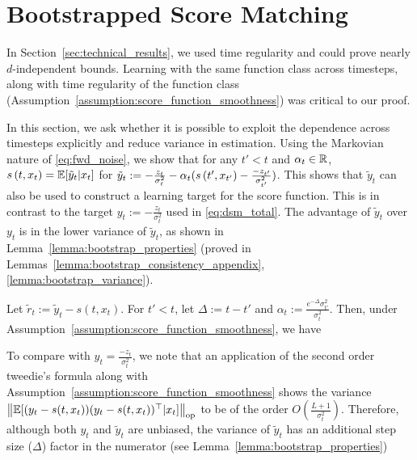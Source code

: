 \vspace{-5pt}
\section{Bootstrapped Score Matching}
\label{sec:bootstrapped_score_matching}

In Section~\ref{sec:technical_results},  we used time regularity and could prove nearly $d$-independent bounds. Learning with the same function class across timesteps, along with time regularity of the function class (Assumption~\ref{assumption:score_function_smoothness}) was critical to our proof.

In this section, we ask whether it is possible to exploit the dependence across timesteps explicitly and reduce variance in estimation. Using the Markovian nature of \eqref{eq:fwd_noise}, we show that for any $t' < t$ and $\alpha_t \in \mathbb{R}$, $s\left(t, x_t\right) = \mathbb{E}[\tilde{y}_{t}|x_t]$ for $\tilde{y}_{t} := -\frac{z_t}{\sigma_t^{2}} - \alpha_t(s\left(t', x_{t'}\right) - \frac{-z_{t'}}{\sigma_{t'}^{2}})$. This shows that $\tilde{y}_{t}$ can also be used to construct a learning target for the score function. This is in contrast to the target $y_{t} := -\frac{z_t}{\sigma_t^{2}}$ used in \eqref{eq:dsm_total}. The advantage of $\tilde{y}_{t}$ over $y_t$ is in the lower variance of $\tilde{y}_{t}$, as shown in Lemma~\ref{lemma:bootstrap_properties} (proved in Lemmas~\ref{lemma:bootstrap_consistency_appendix}, \ref{lemma:bootstrap_variance}). 

\begin{lemma}\label{lemma:bootstrap_properties} Let $\tilde{r}_{t} := \tilde{y}_{t}-s(t, x_t)$. For $t' < t$, let $\Delta := t-t'$ and $\alpha_t := \frac{e^{-\Delta}\sigma_{t'}^{2}}{\sigma_{t}^{2}}$. Then, under Assumption~\ref{assumption:score_function_smoothness}, we have
\end{lemma}

To compare with $y_{t} = \frac{-z_t}{\sigma_{t}^{2}}$, we note that an application of the second order tweedie's formula along with Assumption~\ref{assumption:score_function_smoothness} shows the variance $\left\lVert\mathbb{E}[(y_t-s(t, x_t))(y_t-s(t, x_t))^{\top}|x_{t}]\right\rVert_{\textup{op}}$ to be of the order $O(\frac{L+1}{\sigma_{t}^{2}})$. Therefore, although both $y_{t}$ and $\tilde{y}_{t}$ are unbiased, the variance of $\tilde{y}_{t}$ has an additional step size ($\Delta$) factor in the numerator (see Lemma~\ref{lemma:bootstrap_properties}) 

